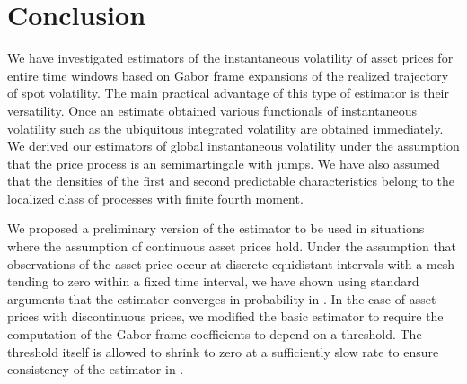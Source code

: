 \section{Conclusion}
We have investigated estimators of the instantaneous volatility of asset prices for   entire time windows based on Gabor frame expansions of the realized trajectory of spot volatility. The main practical advantage of this type of estimator is their versatility. Once an estimate obtained various functionals of instantaneous volatility such as the ubiquitous integrated volatility are obtained immediately. We derived our estimators of global instantaneous volatility under the assumption that  the price process is an  \ito semimartingale with \levy jumps. We have also assumed that the  densities of the first and second predictable characteristics  belong to the localized class of processes with finite fourth moment. 

We proposed a preliminary  version of the estimator to be used in situations where the assumption of continuous asset prices hold. Under the  assumption  that observations of the asset price occur at discrete   equidistant intervals with a mesh tending to zero within a fixed time interval, we have shown using standard arguments that the estimator converges in probability in \Ltwo.  In the case of asset prices with discontinuous prices, we modified the basic estimator  to require the computation of the Gabor frame coefficients to depend on a threshold. The threshold itself is allowed to shrink to zero at a sufficiently slow rate to ensure consistency of the estimator in \Ltwo.  

